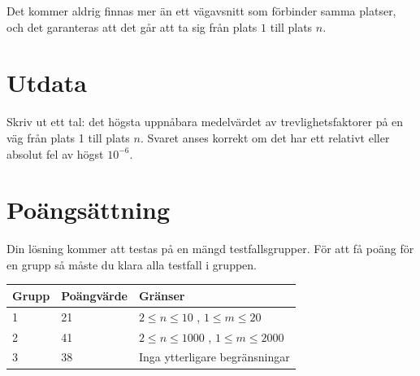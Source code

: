 Det kommer aldrig finnas mer än ett vägavsnitt som förbinder samma platser, och det garanteras
att det går att ta sig från plats $1$ till plats $n$.

\section*{Utdata}
Skriv ut ett tal: det högsta uppnåbara medelvärdet av trevlighetsfaktorer på en väg från plats 1 till plats $n$.
Svaret anses korrekt om det har ett relativt eller absolut fel av högst $10^{-6}$.

\section*{Poängsättning}
Din lösning kommer att testas på en mängd testfallsgrupper. För att få poäng för en grupp så måste du klara alla testfall i gruppen.

\noindent
\begin{tabular}{| l | l | l |}
\hline
Grupp & Poängvärde & Gränser \\ \hline
1     & 21         &  $2 \le n \le 10$ , $1 \le m \le 20$ \\ \hline
2     & 41         &  $2 \le n \le 1000$ , $1 \le m \le 2000$ \\ \hline
3     & 38         & Inga ytterligare begränsningar \\ \hline
\end{tabular}
